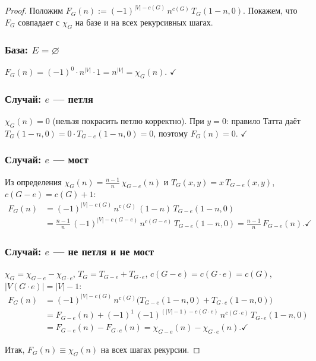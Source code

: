 \begin{proof}
  Положим $F_G(n):=(-1)^{|V|-c(G)}\,n^{c(G)}\,T_G(1-n,0)$.
  Покажем, что $F_G$ совпадает с $\chi_G$ на базе и на всех рекурсивных шагах.

  \subsubsection*{База: $E = \varnothing$}

  $F_G(n)=(-1)^0\cdot n^{|V|}\cdot 1 = n^{|V|} = \chi_G(n)$. $\checkmark$

  \subsubsection*{Случай: $e$ --- петля}

  $\chi_G(n)=0$ (нельзя покрасить петлю корректно).
  При $y=0$: правило Татта даёт $T_G(1-n,0)=0\cdot T_{G-e}(1-n,0)=0$,
  поэтому $F_G(n)=0$. $\checkmark$

  \subsubsection*{Случай: $e$ --- мост}

  Из определения $\chi_G(n)=\frac{n-1}{n}\,\chi_{G-e}(n)$ и
  $T_G(x,y)=x\,T_{G-e}(x,y)$, $c(G-e)=c(G)+1$:
  \begin{align*}
    F_G(n)
    &= (-1)^{|V|-c(G)}\,n^{c(G)}\,(1-n)\,T_{G-e}(1-n,0) \\
    &= \frac{n-1}{n}\,(-1)^{|V|-c(G-e)}\,n^{c(G-e)}\,T_{G-e}(1-n,0)
    = \frac{n-1}{n}\,F_{G-e}(n). \checkmark
  \end{align*}

  \subsubsection*{Случай: $e$ --- не петля и не мост}

  $\chi_G=\chi_{G-e}-\chi_{G\cdot e}$,
  $T_G=T_{G-e}+T_{G\cdot e}$,
  $c(G-e)=c(G\cdot e)=c(G)$, $|V(G\cdot e)|=|V|-1$:
  \begin{align*}
    F_G(n)
    &= (-1)^{|V|-c(G)}\,n^{c(G)}
      \bigl(T_{G-e}(1-n,0)+T_{G\cdot e}(1-n,0)\bigr) \\
    &= F_{G-e}(n)
     + (-1)^{1}\,(-1)^{(|V|-1)-c(G\cdot e)}\,n^{c(G\cdot e)}\,T_{G\cdot e}(1-n,0) \\
    &= F_{G-e}(n) - F_{G\cdot e}(n)
    = \chi_{G-e}(n) - \chi_{G\cdot e}(n). \checkmark
  \end{align*}

  Итак, $F_G(n)\equiv\chi_G(n)$ на всех шагах рекурсии.
\end{proof}
